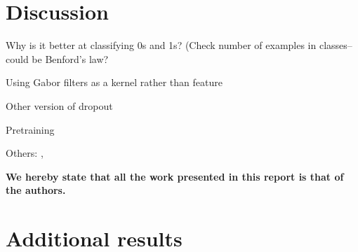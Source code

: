 \documentclass{acm_proc_article-sp}
\begin{document}
\section{Discussion}%
Why is it better at classifying 0s and 1s? (Check number of examples in classes--could be Benford's law?

Using Gabor filters as a kernel rather than feature \cite{Sabri}

Other version of dropout \cite{Wan}

Pretraining \cite{Erhan}

Others: \cite{Rowley}, \cite{Simard}

{\bfseries We hereby state that all the work presented in this report is that of the authors.}




\appendix
\label{appendix}

\section{Additional results}
\label{sec:additional-results}
\end{document}
